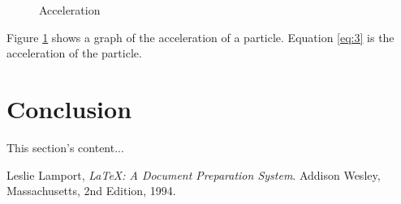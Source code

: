 \documentclass{article}
\begin{document}
\begin{figure}
  \begin{center}
    
  \end{center}
  \caption{Acceleration}
  \label{fig:acceleration}
\end{figure}

Figure \ref{fig:acceleration} shows a graph of the acceleration of a particle. Equation \ref{eq:3} is the acceleration of the particle.

\section{Conclusion}
This section's content...


\begin{thebibliography}{9}

	  Leslie Lamport,
	  \emph{\LaTeX: A Document Preparation System}.
	  Addison Wesley, Massachusetts,
	  2nd Edition,
	  1994.

\end{thebibliography}
\end{document}
